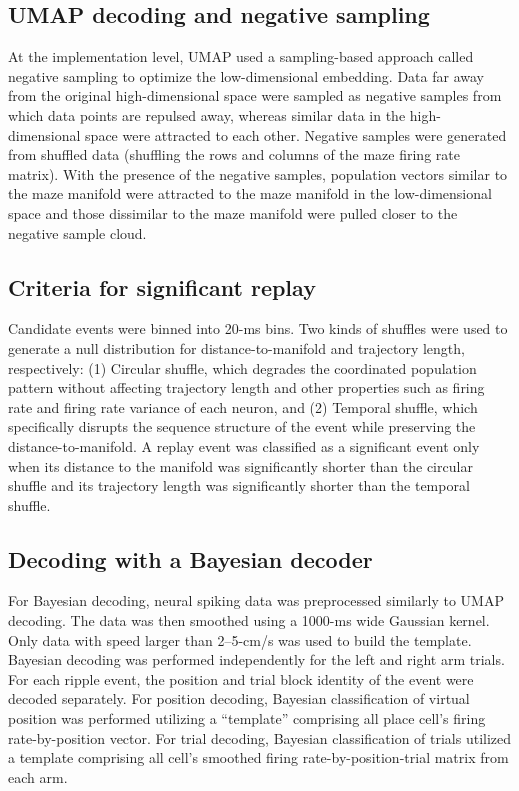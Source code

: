 \subsection{UMAP decoding and negative sampling}

At the implementation level, UMAP used a sampling-based approach called negative sampling to optimize the low-dimensional embedding. Data far away from the original high-dimensional space were sampled as negative samples from which data points are repulsed away, whereas similar data in the high-dimensional space were attracted to each other. Negative samples were generated from shuffled data (shuffling the rows and columns of the maze firing rate matrix). With the presence of the negative samples, population vectors similar to the maze manifold were attracted to the maze manifold in the low-dimensional space and those dissimilar to the maze manifold were pulled closer to the negative sample cloud.

\subsection{Criteria for significant replay}

Candidate events were binned into 20-ms bins. Two kinds of shuffles were used to generate a null distribution for distance-to-manifold and trajectory length, respectively: (1) Circular shuffle, which degrades the coordinated population pattern without affecting trajectory length and other properties such as firing rate and firing rate variance of each neuron, and (2) Temporal shuffle, which specifically disrupts the sequence structure of the event while preserving the distance-to-manifold. A replay event was classified as a significant event only when its distance to the manifold was significantly shorter than the circular shuffle and its trajectory length was significantly shorter than the temporal shuffle.

\subsection{Decoding with a Bayesian decoder}

For Bayesian decoding, neural spiking data was preprocessed similarly to UMAP decoding. The data was then smoothed using a 1000-ms wide Gaussian kernel. Only data with speed larger than 2--5-cm/s was used to build the template. Bayesian decoding was performed independently for the left and right arm trials. For each ripple event, the position and trial block identity of the event were decoded separately. For position decoding, Bayesian classification of virtual position was performed utilizing a ``template'' comprising all place cell's firing rate-by-position vector. For trial decoding, Bayesian classification of trials utilized a template comprising all cell's smoothed firing rate-by-position-trial matrix from each arm.

